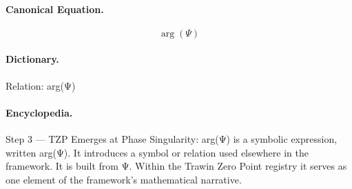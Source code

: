 \paragraph{Canonical Equation.}
\[
\arg(\Psi)
\]

\paragraph{Dictionary.}
Relation: arg(Ψ)

\paragraph{Encyclopedia.}
Step 3 — TZP Emerges at Phase Singularity: arg(Ψ) is a symbolic expression, written arg(Ψ). It introduces a symbol or relation used elsewhere in the framework. It is built from Ψ. Within the Trawin Zero Point registry it serves as one element of the framework's mathematical narrative.
